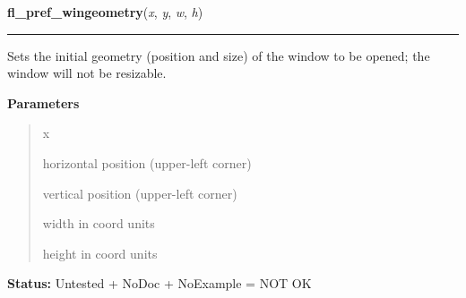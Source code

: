\hspace{.8\funcindent}\begin{boxedminipage}{\funcwidth}

    \raggedright \textbf{fl\_pref\_wingeometry}(\textit{x}, \textit{y}, \textit{w}, \textit{h})

    \vspace{-1.5ex}

    \rule{\textwidth}{0.5\fboxrule}
\setlength{\parskip}{2ex}
    Sets the initial geometry (position and size) of the window to be 
    opened; the window will not be resizable.

\setlength{\parskip}{1ex}
      \textbf{Parameters}
      \vspace{-1ex}

      \begin{quote}
        \begin{Ventry}{x}

          \item[x]

          horizontal position (upper-left corner)

          \item[y]

          vertical position (upper-left corner)

          \item[w]

          width in coord units

          \item[h]

          height in coord units

        \end{Ventry}

      \end{quote}

\textbf{Status:} Untested + NoDoc + NoExample = NOT OK



    \end{boxedminipage}

    \label{xformslib:library:fl_initial_wingeometry}

    \vspace{0.5ex}

